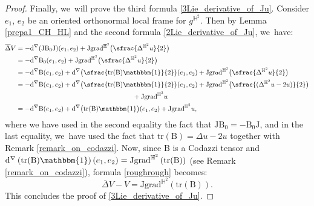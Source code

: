\documentclass[10pt]{amsart}
\newcommand{\psfrac}[2]{\sfrac{(#1)}{#2}}
\theoremstyle{plain}
\theoremstyle{definition}
\newcommand{\grad}{\mathrm{grad}^{\mathbb{H}^2}}
\newcommand{\J}{\mathrm{J}}
\newcommand{\B}{\mathrm{B}}
\begin{document}
\begin{proof}
Finally, we~will prove the third formula \eqref{3Lie_derivative_of_Ju}. Consider $e_1$, $e_2$ be an oriented orthonormal local frame for $g^{\mathbb{H}^2}$. Then by Lemma \ref{prepa1_CH_HL} and the second formula \eqref{2Lie_derivative_of_Ju}, we~have:
\begin{equation}\label{roughrough}
\begin{split}
\overline{\Delta}V&=-\mathrm{d}^{\nabla}(\J\B_0\J)(e_1,e_2)+\J\grad\bigl(\sfrac{\Delta^{\mathbb{H}^2} u}{2}\bigr)\\
&=-\mathrm{d}^{\nabla}\B_0(e_1,e_2)+\J\grad\bigl(\sfrac{\Delta^{\mathbb{H}^2} u}{2}\bigr)\\
&= -\mathrm{d}^{\nabla}\B(e_1,e_2)+\mathrm{d}^{\nabla}\bigl(\sfrac{\mathrm{tr}(\B)\mathbbm{1}}{2} \bigr)(e_1,e_2)+ \J\grad\bigl(\sfrac{\Delta^{\mathbb{H}^2} u}{2}\bigr)\\
&=-\mathrm{d}^{\nabla}\B(e_1,e_2)+\mathrm{d}^{\nabla}\bigl(\sfrac{\mathrm{tr}(\B)\mathbbm{1}}{2} \bigr)(e_1,e_2)+ \J\grad\bigl(\psfrac{\Delta^{\mathbb{H}^2} u-2u}{2}\bigr)\\
&\hspace*{6.15cm}+ \J\grad u \\
&=-\mathrm{d}^{\nabla}\B(e_1,e_2)+\mathrm{d}^{\nabla}\bigl(\mathrm{tr}(\B)\mathbbm{1}\bigr)(e_1,e_2)+ \J\grad u,
\end{split}
\end{equation}
where we have used in the second equality the fact that \(\J\B_0 = -\B_0\J\), and in the last equality, we~have used the fact that \(\mathrm{tr}(\B) = \Delta u - 2u\) together with Remark \ref{remark_on_codazzi}. Now, since \(\B\) is a Codazzi tensor and \(\mathrm{d}^{\nabla}\left(\mathrm{tr}(\B)\mathbbm{1} \right)(e_1,e_2) = \J\grad\left(\mathrm{tr}(\B)\right)\) (see Remark \ref{remark_on_codazzi}), formula \eqref{roughrough} becomes:
\begin{equation}\label{Tension_Ju}
\overline{\Delta}V-V=\J\grad\left(\mathrm{tr}(\B) \right).
\end{equation}
This concludes the proof of \eqref{3Lie_derivative_of_Ju}.
\end{proof}
\end{document}
